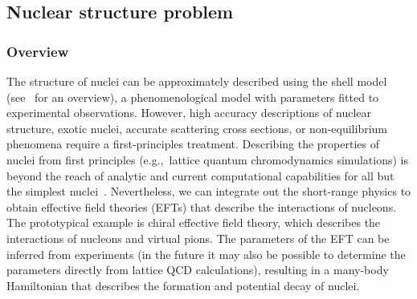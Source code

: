 \begin{refsection}

\subsection{Nuclear structure problem}\label{appl:NuclearStructure}


\subsubsection*{Overview}
The structure of nuclei can be approximately described using the shell model (see~\cite{dean2007BeyondNuclearShell} for an overview), a phenomenological model with parameters fitted to experimental observations. However, high accuracy descriptions of nuclear structure, exotic nuclei, accurate scattering cross sections, or non-equilibrium phenomena require a first-principles treatment. Describing the properties of nuclei from first principles (e.g.,~lattice quantum chromodynamics simulations) is beyond the reach of analytic and current computational capabilities for all but the simplest nuclei~\cite{davoudi2022quantumHEP}. Nevertheless, we can integrate out the short-range physics to obtain effective field theories (EFTs) that describe the interactions of nucleons. The prototypical example is chiral effective field theory, which describes the interactions of nucleons and virtual pions. The parameters of the EFT can be inferred from experiments (in the future it may also be possible to determine the parameters directly from lattice QCD calculations), resulting in a many-body Hamiltonian that describes the formation and potential decay of nuclei.





\end{refsection}

